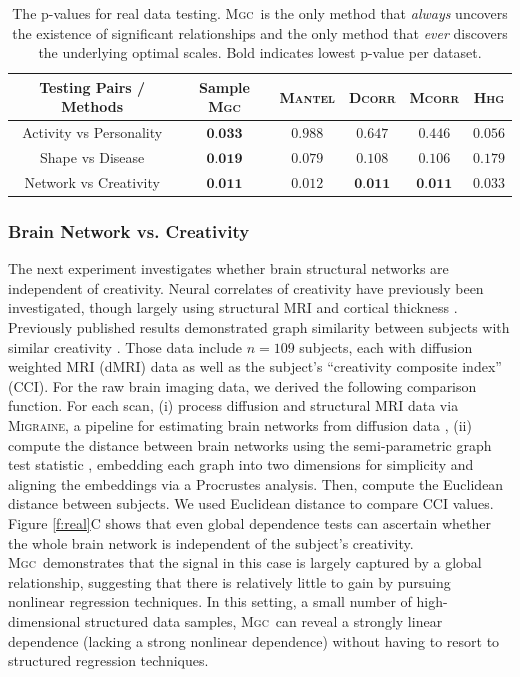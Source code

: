 \documentclass[11pt]{article}
\providecommand{\sct}[1]{{\normalfont\textsc{#1}}}
\newcommand{\Migraine}{\sct{Migraine}}
\newcommand{\Mgc}{\sct{Mgc}}
\newcommand{\Hhg}{\sct{Hhg}}
\newcommand{\Dcorr}{\sct{Dcorr}}
\newcommand{\Mcorr}{\sct{Mcorr}}
\newcommand{\Mantel}{\sct{Mantel}}
\begin{document}
\begin{table}[htbp]
\centering
\caption{The p-values for real data testing. \Mgc~is the only method that \emph{always} uncovers the existence of significant relationships and the only method that \emph{ever} discovers the underlying optimal scales. Bold indicates lowest p-value per dataset.}
\label{t:real}%
\begin{tabular}{|c||c|c|c|c|c|}
\hline
Testing Pairs / Methods & Sample \Mgc & \Mantel & \Dcorr & \Mcorr & \Hhg \\
\hline
Activity vs Personality & $\textbf{0.033}$  & $0.988$ & $0.647$ & $0.446$ & $0.056$ \\
\hline
Shape vs Disease & $\textbf{0.019}$  & $0.079$ & $0.108$ & $0.106$ & $0.179$ \\
\hline
Network vs Creativity & $\textbf{0.011}$  & ${0.012}$ & $\textbf{0.011}$ & $\textbf{0.011}$ & ${0.033}$ \\
\hline
\end{tabular}
\end{table}

\subsubsection*{Brain Network vs. Creativity}

The next experiment investigates whether brain structural networks are independent of creativity.  Neural correlates of creativity have previously been investigated, though largely using structural MRI and cortical thickness \cite{Jung2009}.  Previously published results demonstrated graph similarity between subjects with similar creativity \cite{Koutra15a}. Those data include  $n=109$ subjects, each with diffusion weighted MRI (dMRI) data as well as the subject's ``creativity composite index'' (CCI).  
For the raw brain imaging data, we derived the following comparison function.  For each scan, (i) process diffusion and structural MRI data via  \Migraine, a pipeline for estimating brain networks from diffusion data \cite{GrayRoncal2013}, (ii) 
compute the distance between brain networks using the semi-parametric graph test statistic \cite{Sussman2013,ShenVogelsteinPriebe2016,Tang2016}, embedding each graph into two dimensions for simplicity and aligning the embeddings via a Procrustes analysis.  Then, compute the Euclidean distance between subjects. We used Euclidean distance to compare CCI values. 
% 
Figure \ref{f:real}{\color{magenta}C} shows that even global dependence tests can ascertain whether the whole brain network is independent of the subject's creativity.  \Mgc~demonstrates that the signal in this case is largely captured by a global relationship, suggesting that there is relatively little to gain by pursuing nonlinear regression techniques. In this setting,  a small number of high-dimensional structured data samples, \Mgc~can reveal a strongly linear dependence (lacking a strong nonlinear dependence) without having to resort to structured regression techniques.
\end{document}
